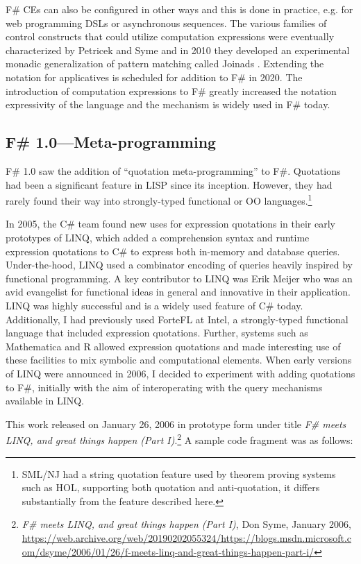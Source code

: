 \documentclass[acmsmall]{acmart}\settopmatter{}
\begin{document}
F\# CEs can also be configured in other ways and this is done in practice, e.g. for web programming DSLs or asynchronous sequences.
The various families of control constructs that could utilize computation expressions were eventually characterized by Petricek
and Syme \citep{Petricek2014} and in 2010 they developed an experimental monadic generalization of pattern matching called Joinads \citep{Petricek2011}.
Extending the notation for applicatives \citep{applicative} is scheduled for addition to F\# in 2020. The introduction of computation expressions to F\# greatly increased the notation expressivity of the language
and the mechanism is widely used in F\# today.

\subsection*{F\# 1.0---Meta-programming}

F\# 1.0 saw the addition of “quotation meta-programming” to F\#.  Quotations had been a significant feature in LISP since its inception. However, they had rarely 
found their way into strongly-typed functional or OO languages.\footnote{SML/NJ had a string quotation feature used by theorem proving systems such as HOL, supporting both quotation and anti-quotation, it differs substantially from the feature described here.}


In 2005, the C\# team found new uses for expression quotations in their early prototypes of LINQ, which added a comprehension syntax and runtime expression quotations to C\# to express both in-memory and database queries. Under-the-hood, LINQ used a combinator encoding of queries heavily inspired by functional programming. A key contributor to LINQ was Erik Meijer who was an avid evangelist for functional ideas in general and innovative in their application. LINQ was highly successful and is a widely used feature of C\# today.  Additionally, I had previously used ForteFL at Intel, a strongly-typed functional language that included expression quotations.  Further, systems such as Mathematica and R allowed expression quotations and made interesting use of these facilities to mix symbolic and computational elements. When early versions of LINQ were announced in 2006, I decided to experiment with adding quotations to F\#, initially with the aim of interoperating with the query mechanisms available in LINQ.  

This work released on January 26, 2006 in prototype form under title \textit{F\# meets LINQ, and great things happen (Part I)}.\footnote{\textit{F\# meets LINQ, and great things happen (Part I)}, Don Syme, January 2006, \url{https://web.archive.org/web/20190202055324/https://blogs.msdn.microsoft.com/dsyme/2006/01/26/f-meets-linq-and-great-things-happen-part-i/}}   A sample code fragment was as follows:
\end{document}
